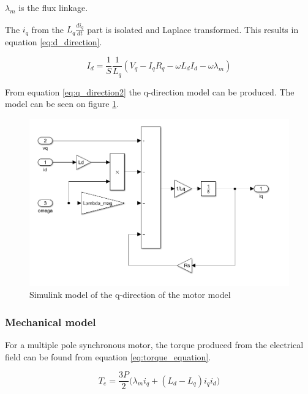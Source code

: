 
$\lambda_m$ is the flux linkage.

The $i_q$ from the $L_q \frac{di_q}{dt}$ part is isolated and Laplace transformed. This results in equation \ref{eq:d_direction}.

\begin{equation}
    \label{eq:q_direction2}
    I_d = \frac{1}{S} \frac{1}{L_q} (V_q - I_q R_q - \omega L_d I_d - \omega \lambda_m)
\end{equation}

From equation \ref{eq:q_direction2} the q-direction model can be produced. The model can be seen on figure \ref{fig:simulink_q_direction}.

\begin{figure}[H]
	\centering
	\includegraphics[width=0.8\linewidth]{pictures/control/simulink_q_direction.PNG}
	\caption{Simulink model of the q-direction of the motor model}
	\label{fig:simulink_q_direction}
\end{figure}


\subsubsection{Mechanical model}
For a multiple pole synchronous motor, the torque produced from the electrical field can be found from equation \ref{eq:torque_equation}.

\begin{equation}
    \label{eq:torque_equation}
    T_e = \frac{3P}{2} \big(\lambda_m i_{q} + (L_d - L_q) i_q i_{d}\big)
\end{equation}

